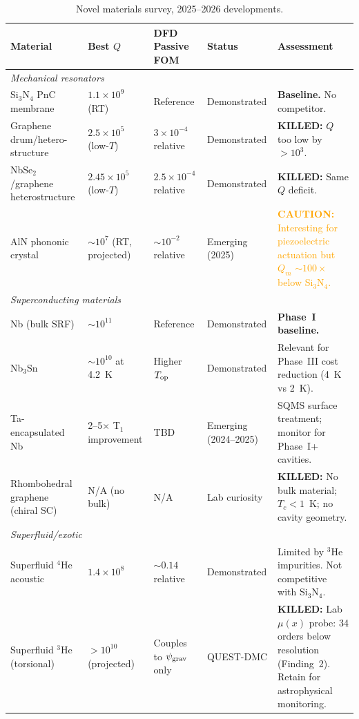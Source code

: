 \documentclass[11pt]{article}
\theoremstyle{definition}
\theoremstyle{remark}
\newcommand{\ee}[1]{\times 10^{#1}}
\newcommand{\psigrav}{\psi_{\rm grav}}
\newcommand{\caution}[1]{\textcolor{orange}{\textbf{CAUTION:} #1}}
\newcommand{\killed}[1]{\textcolor{red!70!black}{\textbf{KILLED:} #1}}
\begin{document}
\begin{table}[H]
\centering
\caption{Novel materials survey, 2025--2026 developments.}
\label{tab:novel_materials}
\renewcommand{\arraystretch}{1.3}
\begin{tabular}{p{3.5cm}p{2cm}p{2.5cm}p{2cm}p{3.5cm}}
\toprule
\textbf{Material} & \textbf{Best $Q$} &
\textbf{DFD Passive FOM} & \textbf{Status} & \textbf{Assessment} \\
\midrule
\multicolumn{5}{l}{\textit{Mechanical resonators}} \\
\midrule
Si$_3$N$_4$ PnC membrane &
  $1.1\ee{9}$ (RT) &
  Reference &
  Demonstrated &
  \textbf{Baseline.} No competitor. \\
Graphene drum/hetero-structure &
  $2.5\ee{5}$ (low-$T$) &
  $3\ee{-4}$ relative &
  Demonstrated &
  \killed{$Q$ too low by $>10^3$.} \\
NbSe$_2$/graphene heterostructure &
  $2.45\ee{5}$ (low-$T$) &
  $2.5\ee{-4}$ relative &
  Demonstrated &
  \killed{Same $Q$ deficit.} \\
AlN phononic crystal &
  $\sim 10^7$ (RT, projected) &
  $\sim 10^{-2}$ relative &
  Emerging (2025) &
  \caution{Interesting for piezoelectric
  actuation but $Q_m$ $\sim 100\times$ below
  Si$_3$N$_4$.} \\
\midrule
\multicolumn{5}{l}{\textit{Superconducting materials}} \\
\midrule
Nb (bulk SRF) &
  $\sim 10^{11}$ &
  Reference &
  Demonstrated &
  \textbf{Phase~I baseline.} \\
Nb$_3$Sn &
  $\sim 10^{10}$ at 4.2~K &
  Higher $T_{\rm op}$ &
  Demonstrated &
  Relevant for Phase~III cost
  reduction (4~K vs 2~K). \\
Ta-encapsulated Nb &
  2--5$\times$ T$_1$ improvement &
  TBD &
  Emerging (2024--2025) &
  SQMS surface treatment;
  monitor for Phase~I+ cavities. \\
Rhombohedral graphene (chiral SC) &
  N/A (no bulk) &
  N/A &
  Lab curiosity &
  \killed{No bulk material; $T_c < 1$~K;
  no cavity geometry.} \\
\midrule
\multicolumn{5}{l}{\textit{Superfluid/exotic}} \\
\midrule
Superfluid $^4$He acoustic &
  $1.4\ee{8}$ &
  $\sim 0.14$ relative &
  Demonstrated &
  Limited by $^3$He impurities.
  Not competitive with Si$_3$N$_4$. \\
Superfluid $^3$He (torsional) &
  $>10^{10}$ (projected) &
  Couples to $\psigrav$ only &
  QUEST-DMC &
  \killed{Lab $\mu(x)$ probe: 34 orders
  below resolution (Finding~2).
  Retain for astrophysical monitoring.} \\
\bottomrule
\end{tabular}
\end{table}
\end{document}
